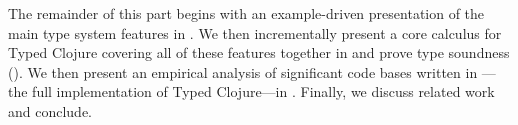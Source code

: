 %
%
%
%

\noindent
 The remainder of this part begins with an example-driven
 presentation of the main type system features in
 . We then incrementally present a core calculus
 for Typed Clojure covering all of these features together in
  and prove type soundness
 (). We then 
 present an empirical analysis of significant code bases written
 in \coretyped{}---the full implementation of Typed Clojure---in . 
 Finally, we discuss related work and conclude.

